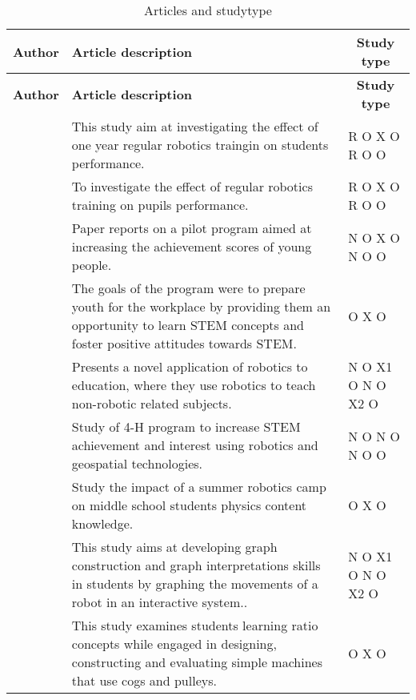 \setlength\LTleft{0px}
\setlength\LTright{0px}
\begin{longtable}{@{\extracolsep{\fill}}p{}p{}p{}}
	\hline \multicolumn{1}{l}{\textbf{Author}} & \multicolumn{1}{l}{\textbf{Article description}} & \multicolumn{1}{c}{\textbf{Study type	}} \\ \hline\hline
	\endfirsthead
	
	\hline
	\multicolumn{1}{l}{\textbf{Author}} & \multicolumn{1}{l}{\textbf{Article description}} & \multicolumn{1}{c}{\textbf{Study type	}} \\ \hline\hline
	\endhead
	
	\hline
	\caption{Articles and studytype}
	\label{tab:type}
	\endlastfoot
	\tcite{hussain2006effect} & This study aim at investigating the effect of one year regular robotics traingin on students performance. & R O X O R O O\\\hline
	\tcite{lindh2007does} & To investigate the effect of regular robotics training on pupils performance. & R O X O R O O\\\hline
	\tcite{barker2007robotics}& Paper reports on a pilot program aimed at increasing the achievement scores of young people. & N O X O N O O\\\hline
	\tcite{nugent2009use} & The goals of the program were to prepare youth for the workplace by providing them an opportunity to learn STEM concepts and foster positive attitudes towards STEM. & O X O\\\hline
	\tcite{mitnik2008autonomous} & Presents a novel application of robotics to education, where they use robotics to teach non-robotic related subjects. & N O X1 O N O X2 O\\\hline
	\tcite{nugent2008effect} & Study of 4-H program to increase STEM achievement and interest using robotics and geospatial technologies. & N O N O N O O\\\hline
	\tcite{williams2007acquisition} & Study the impact of a summer robotics camp on middle school students physics content knowledge.  & O X O\\\hline
	\tcite{mitnik2009collaborative} & This study aims at developing graph construction and graph interpretations skills in students by graphing the movements of a robot in an interactive system..  & N O X1 O N O X2 O\\\hline
	\tcite{norton2004using} & This study examines students learning ratio concepts while engaged in designing, constructing and evaluating simple machines that use cogs and pulleys.  & O X O\\\hline
\end{longtable}
